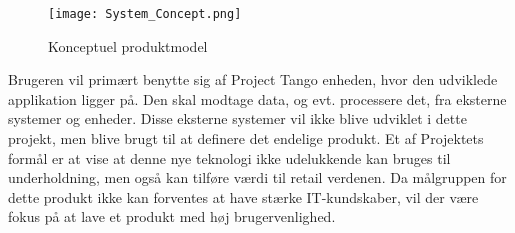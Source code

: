 \begin{figure}[H]
\centering
\texttt{[image: System\_Concept.png]}
\caption{Konceptuel produktmodel}
\label{fig:koncept}
\end{figure}


Brugeren vil primært benytte sig af Project Tango enheden, hvor den udviklede applikation ligger på. Den skal modtage data, og evt. processere det, fra eksterne systemer og enheder. Disse eksterne systemer vil ikke blive udviklet i dette projekt, men blive brugt til at definere det endelige produkt.
Et af Projektets formål er at vise at denne nye teknologi ikke udelukkende kan bruges til underholdning, men også kan tilføre værdi til retail verdenen. Da målgruppen for dette produkt ikke kan forventes at have stærke IT-kundskaber, vil der være fokus på at lave et produkt med høj brugervenlighed. 
